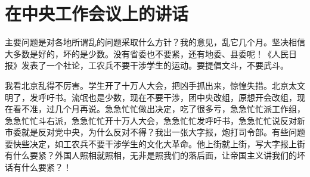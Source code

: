 \section[在中央工作会议上的讲话（一九六六年八月二十三日）]{在中央工作会议上的讲话}


主要问题是对各地所谓乱的问题采取什么方针？我的意见，乱它几个月。坚决相信大多数是好的，坏的是少数。没有省委也不要紧，还有地委、县委呢！《人民日报》发表了一个社论，工农兵不要干涉学生的运动。要提倡文斗，不要武斗。

我看北京乱得不厉害。学生开了十万人大会，把凶手抓出来，惊惶失措。北京太文明了，发呼吁书。流氓也是少数，现在不要干涉，团中央改组，原想开会改组，现在看不准，过几个月再说。急急忙忙做出决定，吃了很多亏，急急忙忙派工作组，急急忙忙斗右派，急急忙忙开十万人大会，急急忙忙发呼吁书，急急忙忙说反对新市委就是反对党中央，为什么反对不得？我出一张大字报，炮打司令部。有些问题要快些决定，如工农兵不要干涉学生的文化大革命。他上街就上街，写大字报上街有什么要紧？外国人照相就照相，无非是照我们的落后面，让帝国主义讲我们的坏话有什么要紧？！

